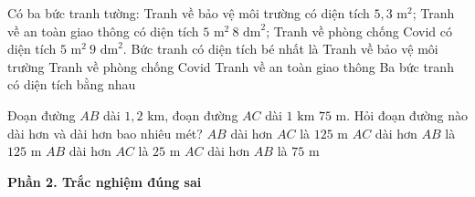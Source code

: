 \begin{ex} %
Có ba bức tranh tường: Tranh về bảo vệ môi trường có diện tích $5{,}3\text{ m}^2$; Tranh về an toàn giao thông có diện tích $5\text{ m}^2\ 8\text{ dm}^2$; Tranh về phòng chống Covid có diện tích $5\text{ m}^2\ 9\text{ dm}^2$. Bức tranh có diện tích bé nhất là
\choice
{Tranh về bảo vệ môi trường}
{Tranh về phòng chống Covid}
{\True Tranh về an toàn giao thông}
{Ba bức tranh có diện tích bằng nhau}
\end{ex}

\begin{ex} %
Đoạn đường $AB$ dài $1{,}2\text{ km}$, đoạn đường $AC$ dài $1\text{ km } 75\text{ m}$. Hỏi đoạn đường nào dài hơn và dài hơn bao nhiêu mét?
\choice
{\True $AB$ dài hơn $AC$ là $125\text{ m}$}
{$AC$ dài hơn $AB$ là $125\text{ m}$}
{$AB$ dài hơn $AC$ là $25\text{ m}$}
{$AC$ dài hơn $AB$ là $75\text{ m}$}
\end{ex}

\textbf{Phần 2. Trắc nghiệm đúng sai}

